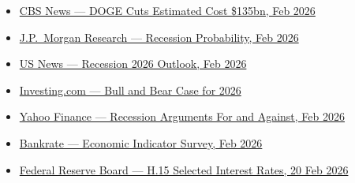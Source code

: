 \documentclass{wilson-report}
\begin{document}
\begin{itemize}[leftmargin=1.2em, itemsep=2pt]
  \item \href{https://www.cbsnews.com/news/doge-cuts-cost-135-billion-analysis-elon-musk-department-of-government-efficiency/}{CBS News --- DOGE Cuts Estimated Cost \$135bn, Feb 2026}
  \item \href{https://www.jpmorgan.com/insights/global-research/economy/recession-probability}{J.P.\ Morgan Research --- Recession Probability, Feb 2026}
  \item \href{https://money.usnews.com/investing/articles/recession-2026-what-to-watch-how-to-prepare}{US News --- Recession 2026 Outlook, Feb 2026}
  \item \href{https://www.investing.com/analysis/the-bullish-and-bearish-case-for-2026-200673858}{Investing.com --- Bull and Bear Case for 2026}
  \item \href{https://finance.yahoo.com/news/2-reasons-why-definitely-getting-155408902.html}{Yahoo Finance --- Recession Arguments For and Against, Feb 2026}
  \item \href{https://www.bankrate.com/banking/federal-reserve/economic-indicator-survey/}{Bankrate --- Economic Indicator Survey, Feb 2026}
  \item \href{https://www.federalreserve.gov/releases/h15/}{Federal Reserve Board --- H.15 Selected Interest Rates, 20 Feb 2026}
\end{itemize}

\signoff
\end{document}
